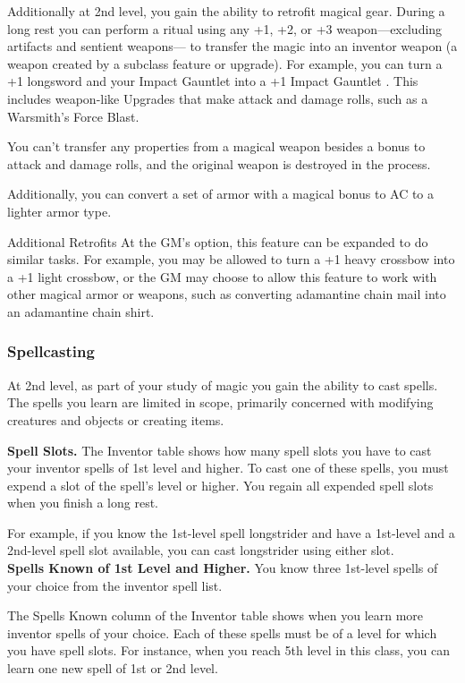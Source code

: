 \documentclass[11pt,twoside,openany]{book}  %
\begin{document}
Additionally at 2nd level, you gain the ability to retrofit magical gear. During a long rest you can perform a ritual using any +1, +2, or +3 weapon—excluding artifacts and sentient weapons— to transfer the magic into an inventor weapon (a weapon created by a subclass feature or upgrade). For example, you can turn a +1 longsword and your Impact Gauntlet into a +1 Impact Gauntlet . This includes weapon-like Upgrades that make attack and damage rolls, such as a Warsmith’s Force Blast.

You can’t transfer any properties from a magical weapon besides a bonus to attack and damage rolls, and the original weapon is destroyed in the process.

Additionally, you can convert a set of armor with a magical bonus to AC to a lighter armor type.
\begin{CalloutBoxSub}{Additional Retrofits}
At the GM’s option, this feature can be expanded to do similar tasks. For example, you may be allowed to turn a +1 heavy crossbow into a +1 light crossbow, or the GM may choose to allow this feature to work with other magical armor or weapons, such as converting adamantine chain mail into an adamantine chain shirt.
\end{CalloutBoxSub}
\subsubsection{Spellcasting}
At 2nd level, as part of your study of magic you gain the ability to cast spells. The spells you learn are limited in scope, primarily concerned with modifying creatures and objects or creating items.

\textbf{Spell Slots.} The Inventor table shows how many spell slots you have to cast your inventor spells of 1st level and higher. To cast one of these spells, you must expend a slot of the spell’s level or higher. You regain all expended spell slots when you finish a long rest.

For example, if you know the 1st-level spell longstrider and have a 1st-level and a 2nd-level spell slot available, you can cast longstrider using either slot. \\

\textbf{Spells Known of 1st Level and Higher.} You know three 1st-level spells of your choice from the inventor spell list. 

The Spells Known column of the Inventor table shows when you learn more inventor spells of your choice. Each of these spells must be of a level for which you have spell slots. For instance, when you reach 5th level in this class, you can learn one new spell of 1st or 2nd level.
\end{document}
